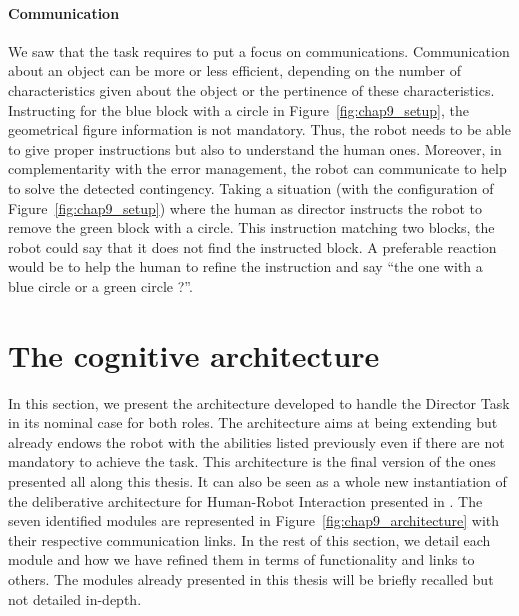 \paragraph{Communication} We saw that the task requires to put a focus on communications. Communication about an object can be more or less efficient, depending on the number of characteristics given about the object or the pertinence of these characteristics. Instructing for the blue block with a circle in Figure~\ref{fig:chap9_setup}, the geometrical figure information is not mandatory. Thus, the robot needs to be able to give proper instructions but also to understand the human ones. Moreover, in complementarity with the error management, the robot can communicate to help to solve the detected contingency. Taking a situation (with the configuration of Figure~\ref{fig:chap9_setup}) where the human as director instructs the robot to remove the green block with a circle. This instruction matching two blocks, the robot could say that it does not find the instructed block. A preferable reaction would be to help the human to refine the instruction and say ``the one with a blue circle or a green circle ?''.

\section{The cognitive architecture}
\label{sec:9_3}

In this section, we present the architecture developed to handle the Director Task in its nominal case for both roles. The architecture aims at being extending but already endows the robot with the abilities listed previously even if there are not mandatory to achieve the task. This architecture is the final version of the ones presented all along this thesis. It can also be seen as a whole new instantiation of the deliberative architecture for Human-Robot Interaction presented in \cite{lemaignan_2017_artificial}. The seven identified modules are represented in Figure~\ref{fig:chap9_architecture} with their respective communication links. In the rest of this section, we detail each module and how we have refined them in terms of functionality and links to others. The modules already presented in this thesis will be briefly recalled but not detailed in-depth.

